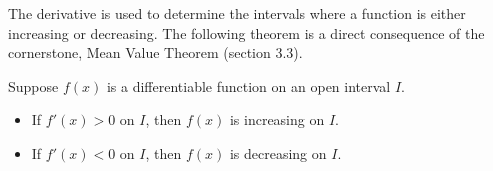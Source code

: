 \documentclass[handout]{ximera}
\begin{document}










The derivative is used to determine the intervals where a function is either 
increasing or decreasing.
The following theorem is a direct consequence of the cornerstone, Mean Value Theorem (section 3.3).


\begin{theorem}
Suppose $f(x)$ is a differentiable function on an open interval $I$.
\begin{itemize}
\item If $f'(x) > 0$ on $I$, then $f(x)$ is increasing on $I$.
\item  If $f'(x) < 0$ on $I$, then $f(x)$ is decreasing on $I$.
\end{itemize}
\end{theorem}
\end{document}
